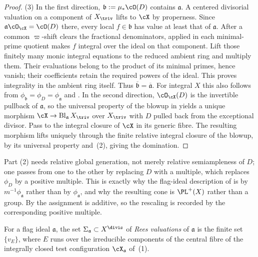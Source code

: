 \begin{proof}
(3)
In the first direction, $\mathfrak b:=\mu_\ast\cO(D)$ contains
$\mathfrak a$.  A centered divisorial valuation on a component of
$X_{\triv}$ lifts to $\cX$ by properness.  Since
$\mathfrak a\cO_{\cX}=\cO(D)$ there, every local $f\in\mathfrak b$
has value at least that of $\mathfrak a$.  After a common
$\varpi$-shift clears the fractional denominators,
 applied in each minimal-prime
quotient makes $f$ integral over the ideal on that component.
Lift those finitely many monic integral equations to the reduced
ambient ring and multiply them.  Their evaluations belong to the
product of its minimal primes, hence vanish; their coefficients retain
the required powers of the ideal.  This proves integrality in the
ambient ring itself.  Thus
$\overline{\mathfrak b}=\overline{\mathfrak a}$.
For integral $X$ this also follows from
$\phi_{\mathfrak b}=\phi_D=\phi_{\mathfrak a}$ and
.  In the second direction, $\cO_{\cX}(D)$
is the invertible pullback of $\mathfrak a$, so the universal property of
the blowup in  yields a unique morphism
$\cX\to\operatorname{Bl}_{\mathfrak a}X_{\triv}$ over $X_{\triv}$ with
$D$ pulled back from the exceptional divisor.  Pass to the integral closure of $\cX$ in its generic fibre.  The resulting
morphism lifts uniquely through the finite relative integral closure of the
blowup, by its universal property and
\,(2), giving the domination.
\end{proof}

\begin{remark}
\label{rem:ch33-semiample-hypothesis}
Part (2) needs relative global
generation, not merely relative semiampleness of $D$; one passes from one
to the other by replacing $D$ with a multiple, which replaces
$\phi_D$ by a positive multiple.  This is exactly why the flag-ideal
description of  is by
$m^{-1}\phi_{\mathfrak a}$ rather than by $\phi_{\mathfrak a}$, and why
the resulting cone is $\PL^+(X)$ rather than a group.  By
 the assignment is additive, so the
rescaling is recorded by the corresponding positive multiple.
\end{remark}

\begin{definition}
\label{def:ch33-rees-valuations}
For a flag ideal $\mathfrak a$, the set $\Sigma_{\mathfrak a}\subset
X^{\divis}$ of \emph{Rees valuations} of $\mathfrak a$ is the finite set
$\{v_E\}$, where $E$ runs over the irreducible components of the central
fibre of the integrally closed test configuration
$\cX_{\mathfrak a}$ of
\,(1).
\end{definition}

